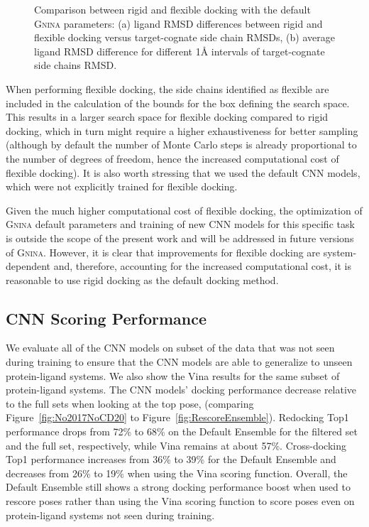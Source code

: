 \documentclass[journal=jcisd8,manuscript=article]{achemso}
\begin{document}
\begin{figure}
\begin{subfigure}[b]{0.48\textwidth}
		\caption{}
		\label{fig:flexRMSDavg}
        \end{subfigure}    
	\caption{Comparison between rigid and flexible docking with the default \textsc{Gnina} parameters: (a) ligand RMSD differences between rigid and flexible docking versus target-cognate side chain RMSDs, (b) average ligand RMSD difference for different 1{\AA} intervals of target-cognate side chains RMSD.}
	\label{fig:flexCD}
\end{figure}

When performing flexible docking, the side chains identified as flexible are included in the calculation of the bounds for the box defining the search space. This results in a larger search space for flexible docking compared to rigid docking, which in turn might require a higher exhaustiveness for better sampling (although by default the number of Monte Carlo steps is already proportional to the number of degrees of freedom, hence the increased computational cost of flexible docking). It is also worth stressing that we used the default CNN models, which were not explicitly trained for flexible docking. 

Given the much higher computational cost of flexible docking, the optimization of \textsc{Gnina} default parameters and training of new CNN models for this specific task is outside the scope of the present work and will be addressed in  future versions of \textsc{Gnina}. However, it is clear that improvements for flexible docking are system-dependent and, therefore, accounting for the increased computational cost, it is reasonable to use rigid docking as the default docking method.

\subsection{CNN Scoring Performance}
We evaluate all of the CNN models on subset of the data that was not seen  during training to ensure that the CNN models are able to generalize to unseen protein-ligand systems. We also show the Vina results for the same subset of protein-ligand systems. The CNN models' docking performance decrease relative to the full sets when looking at the top pose, (comparing Figure~\ref{fig:No2017NoCD20} to Figure~\ref{fig:RescoreEnsemble}). Redocking Top1 performance drops from 72\% to 68\% on the Default Ensemble for the filtered set and the full set, respectively, while Vina remains at about 57\%. Cross-docking Top1 performance increases from 36\% to 39\% for the Default Ensemble and decreases from 26\% to 19\% when using the Vina scoring function. Overall, the Default Ensemble still shows a strong docking performance boost when used to rescore poses rather than using the Vina scoring function to score poses even on protein-ligand systems not seen during training.
\end{document}
